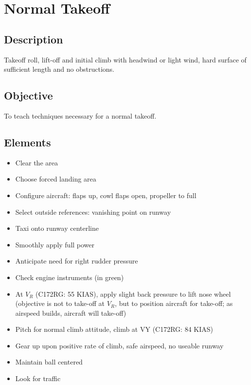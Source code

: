 \section{Normal Takeoff}

\subsection{Description}

Takeoff roll, lift-off and initial climb with headwind or light wind, hard
surface of sufficient length and no obstructions.

\subsection{Objective}

To teach techniques necessary for a normal takeoff.

\subsection{Elements}

\begin{itemize}
  \item Clear the area
  \item Choose forced landing area
  \item Configure aircraft: flaps up, cowl flaps open, propeller to full
  \item Select outside references: vanishing point on runway
  \item Taxi onto runway centerline
  \item Smoothly apply full power
  \item Anticipate need for right rudder pressure
  \item Check engine instruments (in green)
  \item At $V_R$ (C172RG: 55 KIAS), apply slight back pressure to lift nose
    wheel (objective is not to take-off at $V_R$, but to position aircraft for
    take-off; as airspeed builds, aircraft will take-off)
  \item Pitch for normal climb attitude, climb at VY (C172RG: 84 KIAS)
  \item Gear up upon positive rate of climb, safe airspeed, no useable runway 
  \item Maintain ball centered 
  \item Look for traffic
\end{itemize}

